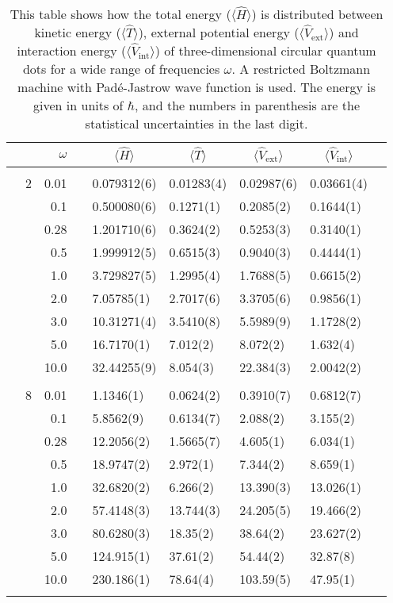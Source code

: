\begin{table}[H]
	\caption{This table shows how the total energy ($\langle\hat{H}\rangle$) is distributed between kinetic energy ($\langle\hat{T}\rangle$), external potential energy ($\langle\hat{V}_{\text{ext}}\rangle$) and interaction energy ($\langle\hat{V}_{\text{int}}\rangle$) of three-dimensional circular quantum dots for a wide range of frequencies $\omega$. A restricted Boltzmann machine with Padé-Jastrow wave function is used. The energy is given in units of $\hbar$, and the numbers in parenthesis are the statistical uncertainties in the last digit.}
	\label{tab:splitfrequencyQDRBMPJ3D}
	\begin{tabularx}{\textwidth}{R{1cm}rrcR{2.3cm}R{2.3cm}R{2.3cm}R{2.3cm}R{1cm}} \hline\hline
		&\makecell{\\ \phantom{$N$} \\ \phantom{=}} & $\omega$ &&  &  &  &  & \\ \hline \\
		&2 & 0.01 && 0.079312(6) & 0.01283(4) & 0.02987(6) & 0.03661(4) \\
		&& 0.1 && 0.500080(6) & 0.1271(1) & 0.2085(2) & 0.1644(1) \\
		&& 0.28 && 1.201710(6) & 0.3624(2) & 0.5253(3) & 0.3140(1) \\
		&& 0.5 && 1.999912(5) & 0.6515(3) & 0.9040(3) & 0.4444(1) \\
		&& 1.0 && 3.729827(5) & 1.2995(4) & 1.7688(5) & 0.6615(2) \\
		&& 2.0 && 7.05785(1) & 2.7017(6) & 3.3705(6) & 0.9856(1) \\
		&& 3.0 && 10.31271(4) & 3.5410(8) & 5.5989(9) & 1.1728(2) \\ 
		&& 5.0 && 16.7170(1) & 7.012(2) & 8.072(2) & 1.632(4) \\
		&& 10.0 && 32.44255(9) & 8.054(3) & 22.384(3) & 2.0042(2) \\
		\hdashline \\
		
		&8 & 0.01 && 1.1346(1) & 0.0624(2) & 0.3910(7) & 0.6812(7) \\
		&& 0.1 && 5.8562(9) & 0.6134(7) & 2.088(2) & 3.155(2) \\
		&& 0.28 && 12.2056(2) & 1.5665(7) & 4.605(1) & 6.034(1) \\
		&& 0.5 && 18.9747(2) & 2.972(1) & 7.344(2) & 8.659(1) \\
		&& 1.0 && 32.6820(2) & 6.266(2) & 13.390(3) & 13.026(1) \\
		&& 2.0 && 57.4148(3) & 13.744(3) & 24.205(5) & 19.466(2) \\
		&& 3.0 && 80.6280(3) & 18.35(2) & 38.64(2) & 23.627(2) \\ 
		&& 5.0 && 124.915(1) & 37.61(2) & 54.44(2) & 32.87(8) \\
		&& 10.0 && 230.186(1) & 78.64(4) & 103.59(5) & 47.95(1) \\
		\hdashline \\
		

\end{tabularx}
\end{table}
